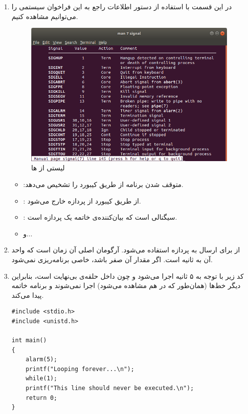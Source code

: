 \newpage


\begin{enumerate}
	\item در این قسمت با استفاده از دستور  اطلاعات راجع به این فراخوان سیستمی را می‌توانیم مشاهده کنیم.
	\begin{figure}[!hbpt]
		\centering
		\includegraphics[scale=0.5]{./img/signal.png}
		\caption{لیستی از ها}
	\end{figure}
	\begin{itemize}
		\item \textbf{}:‌متوقف شدن برنامه از طریق کیبورد را تشخیص می‌دهد.
		\item \textbf{}: از طریق کیبورد از پردازه خارج می‌شود.
		\item \textbf{}: سیگنالی است که بیان‌کننده‌ی خاتمه یک پردازه است.
		\item و...
	\end{itemize}
	\item از  برای ارسال  به پردازه استفاده می‌شود. آرگومان اصلی آن زمان است که واحد آن به ثانیه است. اگر مقدار آن صفر باشد،  خاصی برنامه‌ریزی نمی‌شود.
	\item  کد زیر با توجه به  ۵ ثانیه اجرا می‌شود و چون داخل حلقه‌ی بی‌نهایت است، بنابراین دیگر خط‌ها (همان‌طور که در  هم مشاهده‌ می‌شود) اجرا نمی‌شوند و برنامه خاتمه پیدا می‌کند.
	\begin{Verbatim}[tabsize=4]
#include <stdio.h>
#include <unistd.h>

int main() 
{
	alarm(5);
	printf("Looping forever...\n");
	while(1);
	printf("This line should never be executed.\n");
	return 0;
}
	\end{Verbatim}
	


\end{enumerate}
